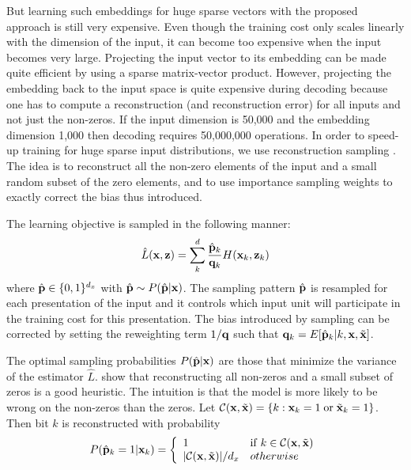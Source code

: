 But learning such embeddings for huge sparse vectors with the proposed approach
is still very expensive. Even though the training cost only scales linearly
with the dimension of the input, it can become too expensive when the input
becomes very large. Projecting the input vector to its embedding can be made
quite efficient by using a sparse matrix-vector product. However, projecting
the embedding back to the input space is quite expensive during decoding because
one has to compute a reconstruction (and reconstruction error)
for all inputs and not just the non-zeros. If
the input dimension is 50,000 and the embedding dimension 1,000 then decoding
requires 50,000,000 operations. In order to speed-up training for huge sparse
input distributions, we use reconstruction sampling \citep{Dauphin+al-2011}. The
idea is to reconstruct all the non-zero elements of the input and a small
random subset of the zero elements, and to use importance sampling weights
to exactly correct the bias thus introduced.

The learning objective is sampled in the following manner: \[ \hat{L}({\bf x},
{\bf z}) = \sum_k^d \frac{\hat{\bf p}_k}{{\bf q}_k} H({\bf x}_k, {\bf z}_k) \]
where $\hat{\bf p} \in \{0, 1\}^{d_x}$ with $\hat{\bf p} \sim P(\hat{\bf
p}|{\bf x})$. The sampling pattern $\hat{\bf p}$ is resampled for each
presentation of the input and it controls which input unit will participate in
the training cost for this presentation. The bias introduced by sampling can be
corrected by setting the reweighting term $1/{\bf q}$ such that ${\bf
q}_k=E[\hat{\bf p}_k|k,{\bf x},\tilde{\bf x}]$.

The optimal sampling probabilities $P(\hat{\bf p}|{\bf x})$ are those that
minimize the variance of the estimator $\hat{L}$. \citep{Dauphin+al-2011} show that
reconstructing all non-zeros and a small subset of zeros is a good heuristic.
The intuition is that the model is more likely to be wrong on the non-zeros
than the zeros. Let ${\cal C}({\bf x},\tilde{\bf x})=\{k: {\bf x}_k=1 \;{\rm
or}\;\tilde{\bf x}_k=1\}$. Then bit $k$ is reconstructed with probability
\begin{equation} \label{eq:p} P(\hat{\bf p}_k=1|{\bf x}_k) = \left\{
    \begin{array}{ll} 1 & {\rm if}\; k \in {\cal C}({\bf x},\tilde{\bf x}) \\
    |{\cal C}({\bf x},\tilde{\bf x})|/d_x & otherwise \end{array} \right.
\end{equation}

